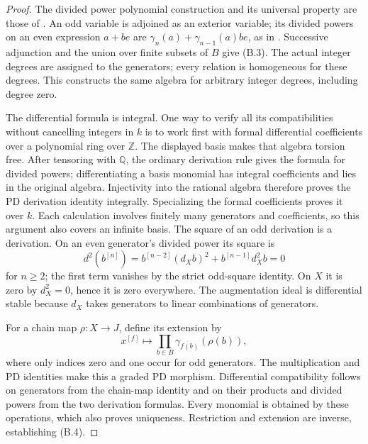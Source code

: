 \begin{proof}
The divided power polynomial construction and its universal property
are those of \cite[Lemma 23.5.1, Tag 07H5]{B_StacksPD}.
An odd variable is adjoined as an exterior variable; its divided powers
on an even expression $a+be$ are
$\gamma_n(a)+\gamma_{n-1}(a)be$, as in
\cite[Example 23.6.2]{B_StacksTate}.
Successive adjunction and the union over finite subsets of $B$ give
\textup{(B.3)}.  The actual integer degrees are assigned to the generators;
every relation is homogeneous for these degrees.  This constructs
the same algebra for arbitrary integer degrees, including degree zero.

The differential formula is integral.  One way to verify all its
compatibilities without cancelling integers in $k$ is to work first with
formal differential coefficients over a polynomial ring over $\mathbb Z$.
The displayed basis makes that algebra torsion free.  After tensoring with
$\mathbb Q$, the ordinary derivation rule gives the formula for divided
powers; differentiating a basis monomial has integral coefficients and
lies in the original algebra.  Injectivity into the rational algebra
therefore proves the PD derivation identity integrally.  Specializing the
formal coefficients proves it over $k$.  Each calculation involves
finitely many generators and coefficients, so this argument also covers
an infinite basis.  The square of an odd derivation is a derivation.
On an even generator's divided power its square is
\[
d^2(b^{[n]})=b^{[n-2]}(d_Xb)^2+b^{[n-1]}d_X^2b=0
\]
for $n\geq2$; the first term vanishes by the strict odd-square identity.
On $X$ it is zero by $d_X^2=0$, hence it is zero everywhere.
The augmentation ideal is differential stable because $d_X$ takes
generators to linear combinations of generators.

For a chain map $\rho:X\to J$, define its extension by
\[
x^{[f]}\longmapsto\prod_{b\in B}\gamma_{f(b)}(\rho(b)),           \tag{B.5}
\]
where only indices zero and one occur for odd generators.
The multiplication and PD identities make this a graded PD morphism.
Differential compatibility follows on generators from the chain-map
identity and on their products and divided powers from the two
derivation formulas.  Every monomial is obtained by these operations,
which also proves uniqueness.  Restriction and extension are inverse,
establishing \textup{(B.4)}.


\end{proof}
